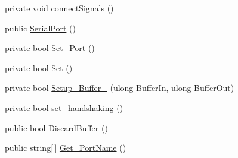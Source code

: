 \begin{DoxyCompactItemize}
\item 
private void \hyperlink{namespaceedwinspire_1_1_ports_af8d9afe49636a2f0ba22f1f17bbaba17}{connect\-Signals} ()
\item 
public \hyperlink{namespaceedwinspire_1_1_ports_a293ef58b4105463e6bd4b2d5ad9b3144}{Serial\-Port} ()
\item 
private bool \hyperlink{namespaceedwinspire_1_1_ports_a17877b618445a0e65f46c94bc80bc821}{Set\-\_\-\-Port} ()
\item 
private bool \hyperlink{namespaceedwinspire_1_1_ports_ab4f5440159397421d6f1985dccda8aa7}{Set} ()
\item 
private bool \hyperlink{namespaceedwinspire_1_1_ports_a7a08c939ddf6ae7e1426b3bd061c3f13}{Setup\-\_\-\-Buffer\-\_\-} (ulong Buffer\-In, ulong Buffer\-Out)
\item 
private bool \hyperlink{namespaceedwinspire_1_1_ports_a16c386569d50ef1f47b43bce24c54cde}{set\-\_\-handshaking} ()
\item 
public bool \hyperlink{namespaceedwinspire_1_1_ports_ae3a4888c33e46ef2cb9c21475b39747d}{Discard\-Buffer} ()
\item 
public string\mbox{[}$\,$\mbox{]} \hyperlink{namespaceedwinspire_1_1_ports_ab6cd9fa85820a8013aa6f47c89eb8102}{Get\-\_\-\-Port\-Name} ()
\end{DoxyCompactItemize}
